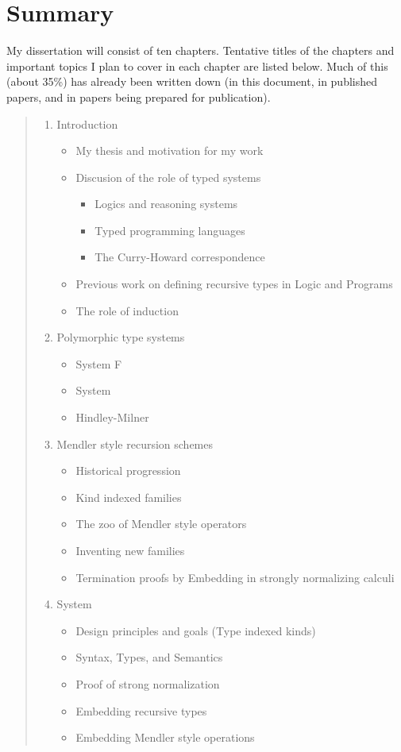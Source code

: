 \section{Summary}\label{sec:summary}
My dissertation will consist of ten chapters.
Tentative titles of the chapters and important topics I plan to cover in each
chapter are listed below. Much of this (about 35\%) has already been written down
(in this document, in published papers, and in papers being prepared
for publication). 
\begin{quote}
\begin{enumerate}[1.]
\item Introduction
\begin{itemize}
\item My thesis and motivation for my work
\item Discusion of the role of typed systems
   \begin{itemize}
     \item Logics and reasoning systems
     \item Typed programming languages
     \item The Curry-Howard correspondence
   \end{itemize}
\item Previous work on defining recursive types in Logic and Programs
\item The role of induction
\end{itemize}

\item Polymorphic type systems 
 \begin{itemize}
     \item System \textsf{F}
     \item System \Fw
     \item Hindley-Milner
 \end{itemize}
 
\item Mendler style recursion schemes
  \begin{itemize}
     \item Historical progression
     \item Kind indexed families
     \item The zoo of Mendler style operators
     \item Inventing new families
     \item Termination proofs by Embedding in strongly normalizing calculi
  \end{itemize}

\item System \Fi
  \begin{itemize}
     \item Design principles and goals (Type indexed kinds)
     \item Syntax, Types, and Semantics
     \item Proof of strong normalization
     \item Embedding recursive types
     \item Embedding Mendler style operations
  \end{itemize}
  

\end{enumerate}
\end{quote}
